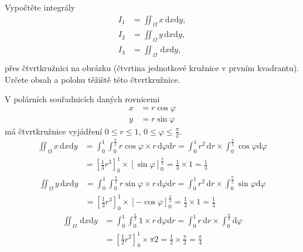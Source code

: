 \let\phi \varphi
{}


Vypočtěte integrály
$$
\begin{aligned}
  I_1&=\iint_\Omega x\,\mathrm dx \mathrm dy,\\
  I_2&=\iint_\Omega y\,\mathrm dx \mathrm dy,\\
  I_3&=\iint_\Omega \,\mathrm dx \mathrm dy,\\
\end{aligned}
$$
přes čtvrtkružnici na obrázku (čtvrtina jednotkové kružnice v prvním kvadrantu).
Určete obsah a polohu těžiště této čtvrtkružnice.

\reseni

V polárních souřadnicích daných rovnicemi $$
\begin{aligned}
  x&=r\cos\phi\\
  y&=r\sin\phi
\end{aligned}
$$
má čtvrtkružnice vyjádření $0\leq r\leq 1$, $0\leq \phi\leq \frac \pi2$.
$$
\begin{aligned}
  \iint_\Omega x\,\mathrm dx\mathrm dy
  &=\int_0^1 \int_0^{\frac \pi2} r\cos\phi \times r\,\mathrm d\phi\mathrm dr
  =\int_0^1 r^2 \,\mathrm dr \times \int_0^{\frac \pi2}\cos\phi \mathrm d \phi
  \\&=\left[\frac 13 r^3\right]_0^1\times \left[\sin\phi\right]_0^{\frac \pi2}=\frac 13 \times 1=\frac 13
\end{aligned}
$$$$
\begin{aligned}
  \iint_\Omega y\,\mathrm dx\mathrm dy
  &=\int_0^1 \int_0^{\frac \pi2} r\sin\phi \times r\,\mathrm d\phi\mathrm dr
  =\int_0^1 r^2 \,\mathrm dr \times \int_0^{\frac \pi2}\sin\phi \mathrm d \phi
  \\&=\left[\frac 13 r^3\right]_0^1\times \left[-\cos\phi\right]_0^{\frac \pi2}=\frac 13 \times 1=\frac 13
\end{aligned}
$$
$$
\begin{aligned}
  \iint_\Omega \,\mathrm dx\mathrm dy
  &=\int_0^1 \int_0^{\frac \pi2} 1 \times r\,\mathrm d\phi\mathrm dr
  =\int_0^1 r \,\mathrm dr \times \int_0^{\frac \pi2}\mathrm d \phi
  \\&=\left[\frac 12 r^2\right]_0^1\times {\pi2}=\frac 12 \times \frac \pi 2=\frac \pi 4
\end{aligned}
$$


